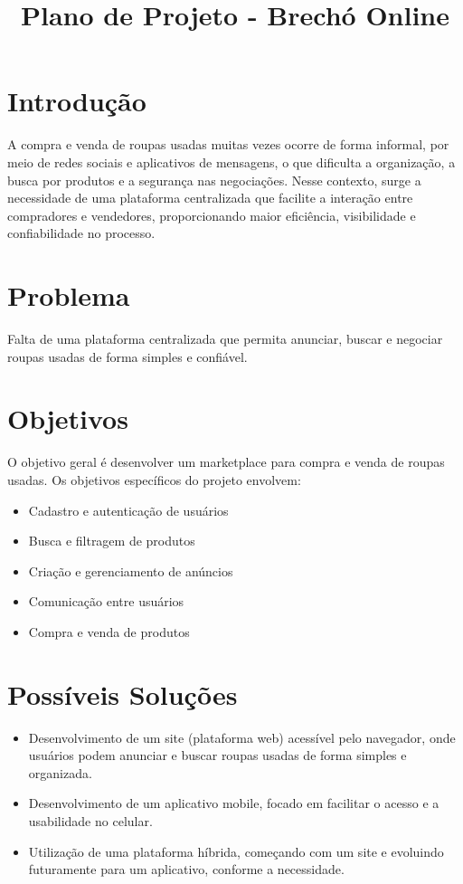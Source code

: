 \documentclass[a4paper,12pt]{article}
\title{Plano de Projeto - Brechó Online}
\author{}
\date{}
\begin{document}
\maketitle

\section{Introdução}
A compra e venda de roupas usadas muitas vezes ocorre de forma informal, por meio de redes sociais e aplicativos de mensagens, o que dificulta a organização, a busca por produtos e a segurança nas negociações. Nesse contexto, surge a necessidade de uma plataforma centralizada que facilite a interação entre compradores e vendedores, proporcionando maior eficiência, visibilidade e confiabilidade no processo.

\section{Problema}
Falta de uma plataforma centralizada que permita anunciar, buscar e negociar roupas usadas de forma simples e confiável.

\section{Objetivos}
O objetivo geral é desenvolver um marketplace para compra e venda de roupas usadas. Os objetivos específicos do projeto envolvem: 

\begin{itemize}
    \item Cadastro e autenticação de usuários
    \item Busca e filtragem de produtos
    \item Criação e gerenciamento de anúncios
    \item Comunicação entre usuários
    \item Compra e venda de produtos
\end{itemize}

\section{Possíveis Soluções}
\begin{itemize}
    \item Desenvolvimento de um site (plataforma web) acessível pelo navegador, onde usuários podem anunciar e buscar roupas usadas de forma simples e organizada.
    \item Desenvolvimento de um aplicativo mobile, focado em facilitar o acesso e a usabilidade no celular.
    \item Utilização de uma plataforma híbrida, começando com um site e evoluindo futuramente para um aplicativo, conforme a necessidade.
\end{itemize}
\end{document}
